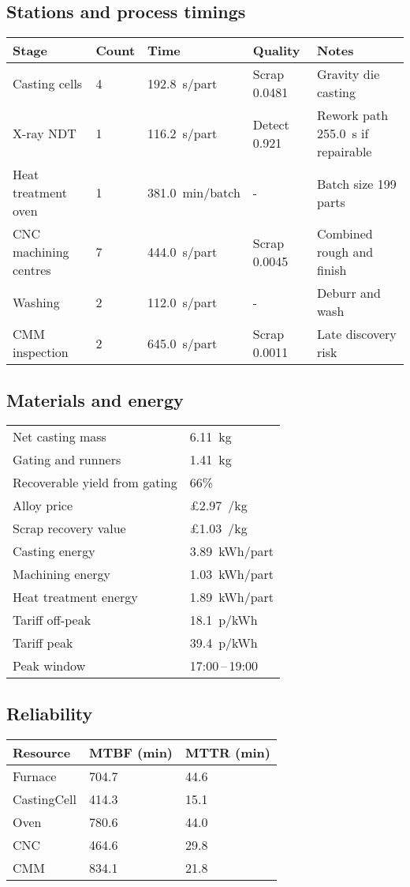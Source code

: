 \documentclass[11pt,a4paper]{article}
\begin{document}
\subsection*{Stations and process timings}
\begin{longtable}{@{}lllll@{}}
\toprule
\textbf{Stage} & \textbf{Count} & \textbf{Time} & \textbf{Quality} & \textbf{Notes} \\
\midrule
Casting cells & 4 & 192.8~s/part & Scrap 0.0481 & Gravity die casting \\
X-ray NDT & 1 & 116.2~s/part & Detect 0.921 & Rework path 255.0~s if repairable \\
Heat treatment oven & 1 & 381.0~min/batch & - & Batch size 199 parts \\
CNC machining centres & 7 & 444.0~s/part & Scrap 0.0045 & Combined rough and finish \\
Washing & 2 & 112.0~s/part & - & Deburr and wash \\
CMM inspection & 2 & 645.0~s/part & Scrap 0.0011 & Late discovery risk \\
\bottomrule
\end{longtable}

\subsection*{Materials and energy}
\begin{tabular}{@{}ll@{}}
\toprule
Net casting mass & 6.11~kg \\
Gating and runners & 1.41~kg \\
Recoverable yield from gating & 66\% \\
Alloy price & \pounds 2.97~/kg \\
Scrap recovery value & \pounds 1.03~/kg \\
\midrule
Casting energy & 3.89~kWh/part \\
Machining energy & 1.03~kWh/part \\
Heat treatment energy & 1.89~kWh/part \\
Tariff off-peak & 18.1~p/kWh \\
Tariff peak & 39.4~p/kWh \\
Peak window & 17:00\,--\,19:00 \\
\bottomrule
\end{tabular}

\subsection*{Reliability}
\begin{tabular}{@{}lll@{}}
\toprule Resource & MTBF (min) & MTTR (min) \\
\midrule
Furnace & 704.7 & 44.6 \\
CastingCell & 414.3 & 15.1 \\
Oven & 780.6 & 44.0 \\
CNC & 464.6 & 29.8 \\
CMM & 834.1 & 21.8 \\
\bottomrule
\end{tabular}
\end{document}
